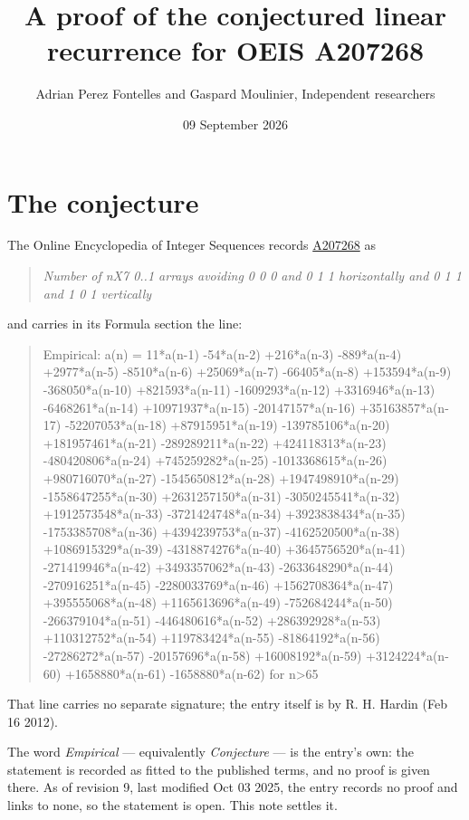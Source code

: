 \documentclass[11pt]{article}
\title{A proof of the conjectured linear recurrence for OEIS A207268}
\author{Adrian Perez Fontelles and Gaspard Moulinier, Independent researchers}
\date{09 September 2026}
\theoremstyle{definition}
\begin{document}
\maketitle
\section{The conjecture}

The Online Encyclopedia of Integer Sequences records \href{https://oeis.org/A207268}{A207268} as

\begin{quote}\itshape Number of nX7 0..1 arrays avoiding 0 0 0 and 0 1 1 horizontally and 0 1 1 and 1 0 1 vertically\end{quote}

and carries in its Formula section the line:

\begin{quote}\ttfamily Empirical: a(n) = 11*a(n-1) -54*a(n-2) +216*a(n-3) -889*a(n-4) +2977*a(n-5) -8510*a(n-6) +25069*a(n-7) -66405*a(n-8) +153594*a(n-9) -368050*a(n-10) +821593*a(n-11) -1609293*a(n-12) +3316946*a(n-13) -6468261*a(n-14) +10971937*a(n-15) -20147157*a(n-16) +35163857*a(n-17) -52207053*a(n-18) +87915951*a(n-19) -139785106*a(n-20) +181957461*a(n-21) -289289211*a(n-22) +424118313*a(n-23) -480420806*a(n-24) +745259282*a(n-25) -1013368615*a(n-26) +980716070*a(n-27) -1545650812*a(n-28) +1947498910*a(n-29) -1558647255*a(n-30) +2631257150*a(n-31) -3050245541*a(n-32) +1912573548*a(n-33) -3721424748*a(n-34) +3923838434*a(n-35) -1753385708*a(n-36) +4394239753*a(n-37) -4162520500*a(n-38) +1086915329*a(n-39) -4318874276*a(n-40) +3645756520*a(n-41) -271419946*a(n-42) +3493357062*a(n-43) -2633648290*a(n-44) -270916251*a(n-45) -2280033769*a(n-46) +1562708364*a(n-47) +395555068*a(n-48) +1165613696*a(n-49) -752684244*a(n-50) -266379104*a(n-51) -446480616*a(n-52) +286392928*a(n-53) +110312752*a(n-54) +119783424*a(n-55) -81864192*a(n-56) -27286272*a(n-57) -20157696*a(n-58) +16008192*a(n-59) +3124224*a(n-60) +1658880*a(n-61) -1658880*a(n-62) for n>65\end{quote}

That line carries no separate signature; the entry itself is by R. H. Hardin (Feb 16 2012).

The word {\itshape Empirical} --- equivalently {\itshape Conjecture} --- is the entry's own: the statement is recorded as fitted to the published terms, and no proof is given there. As of revision 9, last modified Oct 03 2025, the entry records no proof and links to none, so the statement is open. This note settles it.
\end{document}
